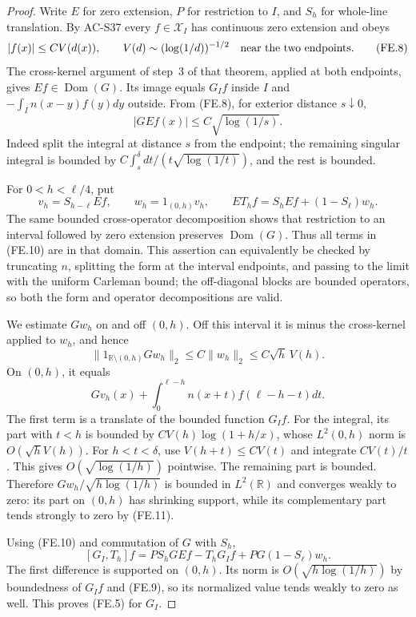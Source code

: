 \begin{proof}
Write \(E\) for zero extension, \(P\) for restriction to \(I\),
and \(S_h\) for whole-line translation.  By AC-S37 every
\(f\in\mathcal X_I\) has continuous zero extension and obeys
\[
 |f(x)|\leq C V(d(x)),\qquad
 V(d)\sim(\log(1/d))^{-1/2}
                  \quad\hbox{near the two endpoints}.    \tag{FE.8}
\]
The cross-kernel argument of step~3 of that theorem, applied at
both endpoints, gives \(Ef\in\operatorname{Dom}(G)\).
Its image equals \(G_If\) inside \(I\) and
\(-\int_I n(x-y)f(y)dy\) outside.  From (FE.8), for exterior
distance \(s\downarrow0\),
\[
                  |GEf(x)|\leq C\sqrt{\log(1/s)}.        \tag{FE.9}
\]
Indeed split the integral at distance \(s\) from the endpoint;
the remaining singular integral is bounded by
\(C\int_s^\delta dt/(t\sqrt{\log(1/t)})\), and the rest is bounded.

For \(0<h<\ell/4\), put
\[
 v_h=S_{h-\ell}Ef,\qquad w_h=1_{(0,h)}v_h,
 \qquad ET_hf=S_hEf+(1-S_\ell)w_h.                        \tag{FE.10}
\]
The same bounded cross-operator decomposition shows that restriction
to an interval followed by zero extension preserves
\(\operatorname{Dom}(G)\).  Thus all terms in (FE.10) are in that
domain.  This assertion can equivalently be checked by truncating
\(n\), splitting the form at the interval endpoints, and passing
to the limit with the uniform Carleman bound; the off-diagonal
blocks are bounded operators, so both the form and operator
decompositions are valid.

We estimate \(Gw_h\) on and off \((0,h)\).  Off this interval
it is minus the cross-kernel applied to \(w_h\), and hence
\[
 \|1_{\mathbb R\setminus(0,h)}Gw_h\|_2
              \leq C\|w_h\|_2\leq C\sqrt h\,V(h).        \tag{FE.11}
\]
On \((0,h)\), it equals
\[
 Gv_h(x)+\int_0^{\ell-h}n(x+t)f(\ell-h-t)dt.             \tag{FE.12}
\]
The first term is a translate of the bounded function \(G_If\).
For the integral, its part with \(t<h\) is bounded by
\(CV(h)\log(1+h/x)\), whose \(L^2(0,h)\) norm is
\(O(\sqrt h V(h))\).  For \(h<t<\delta\), use
\(V(h+t)\leq C V(t)\) and integrate \(CV(t)/t\).
This gives \(O(\sqrt{\log(1/h)})\) pointwise.
The remaining part is bounded.  Therefore
\(Gw_h/\sqrt{h\log(1/h)}\) is bounded in \(L^2(\mathbb R)\)
and converges weakly to zero: its part on \((0,h)\) has shrinking
support, while its complementary part tends strongly to zero
by (FE.11).

Using (FE.10) and commutation of \(G\) with \(S_h\),
\[
 [G_I,T_h]f
  =PS_hGEf-T_hG_If+PG(1-S_\ell)w_h.                      \tag{FE.13}
\]
The first difference is supported on \((0,h)\).
Its norm is \(O(\sqrt{h\log(1/h)})\) by boundedness of \(G_If\)
and (FE.9), so its normalized value tends weakly to zero as well.
This proves (FE.5) for \(G_I\).


\end{proof}
